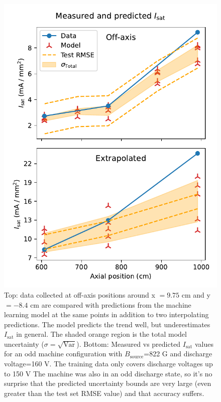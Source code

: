 \begin{figure}
	\centering
	\includegraphics[width=\columnwidth]{figures/measured-vs-predicted_off-axis_160V}
	\caption[size=12]{\label{fig:measured-vs-predicted}Top: data collected at off-axis positions around x $=9.75$ cm and y $=-8.4$ cm are compared with predictions from the machine learning model at the same points in addition to two interpolating predictions. The model predicts the trend well, but underestimates $I_\text{sat}$ in general. The shaded orange region is the total model uncertainty ($\sigma = \sqrt{\text{Var}}$). Bottom: Measured vs predicted $I_\text{sat}$ values for an odd machine configuration with $B_\text{source}$=822 G and discharge voltage=160 V. The training data only covers discharge voltages up to 150 V The machine was also in an odd discharge state, so it's no surprise that the predicted uncertainty bounds are very large (even greater than the test set RMSE value) and that accuracy suffers.}
\end{figure}

